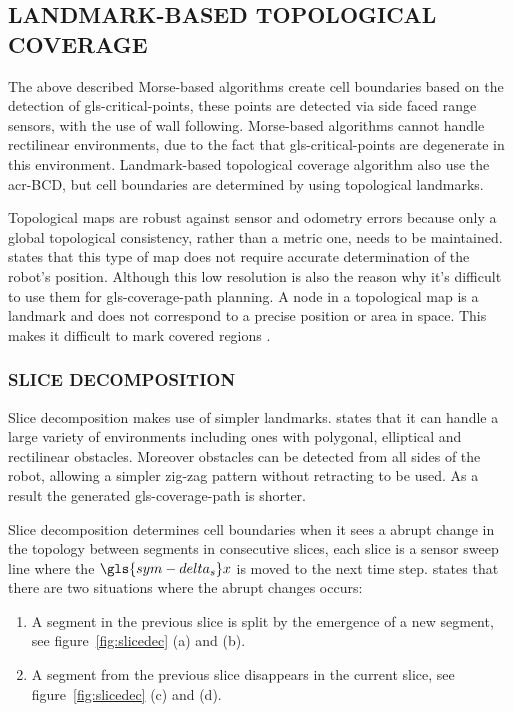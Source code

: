 \subsection{LANDMARK-BASED TOPOLOGICAL COVERAGE}
The above described Morse-based algorithms create cell boundaries based on the detection of \gls{gls-critical-point}s,
these points are detected via side faced range sensors, with the use of wall following. Morse-based algorithms cannot
handle rectilinear environments, due to the fact that \gls{gls-critical-point}s are degenerate in this environment.
Landmark-based topological coverage algorithm also use the \gls{acr-BCD}, but cell boundaries are determined by using
topological landmarks.

Topological maps are robust against sensor and odometry errors because only a global topological consistency, rather
than a metric one, needs to be maintained. \citet{thrun_learning_1998} states that this type of map does not require
accurate determination of the robot's position. Although this low resolution is also the reason why it's difficult to
use them for \gls{gls-coverage-path} planning. A node in a topological map is a landmark and does not correspond to a
precise position or area in space. This makes it difficult to mark covered regions \cite{wong_qualitative_2006}.

\subsubsection{SLICE DECOMPOSITION}\label{subsec:slicedecomp}
Slice decomposition makes use of simpler landmarks. \citet{galceran_survey_2013} states that it can handle a large
variety of environments including ones with polygonal, elliptical and rectilinear obstacles. Moreover obstacles can be
detected from all sides of the robot, allowing a simpler zig-zag pattern without retracting to be used. As a result the
generated \gls{gls-coverage-path} is shorter.

Slice decomposition determines cell boundaries when it sees a abrupt change in the topology between segments in
consecutive slices, each slice is a sensor sweep line where the \( \gls{sym-delta_s}  x \) is moved to the next time
step. \citeauthor{wong_complete_2004} states that there are two situations where the abrupt changes occurs:

\begin{enumerate}
	\item A segment in the previous slice is split by the emergence of a new segment, see figure~\ref{fig:slicedec} (a) and (b).
	\item A segment from the previous slice disappears in the current slice, see figure~\ref{fig:slicedec} (c) and (d).
\end{enumerate}

